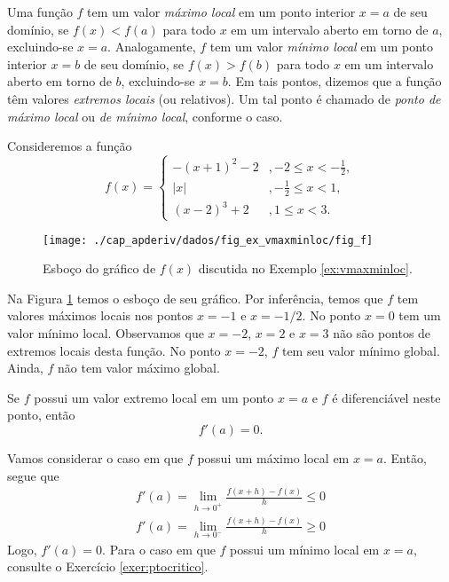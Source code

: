 Uma função $f$ tem um valor \emph{máximo local} em um ponto interior $x=a$ de seu domínio, se $f(x) < f(a)$ para todo $x$ em um intervalo aberto em torno de $a$, excluindo-se $x=a$. Analogamente, $f$ tem um valor \emph{mínimo local} em um ponto interior $x=b$ de seu domínio, se $f(x) > f(b)$  para todo $x$ em um intervalo aberto em torno de $b$, excluindo-se $x=b$. Em tais pontos, dizemos que a função têm valores \emph{extremos locais} (ou relativos). Um tal ponto é chamado de \emph{ponto de máximo local} ou \emph{de mínimo local}, conforme o caso.

\begin{ex}\label{ex:vmaxminloc}
  Consideremos a função
  \begin{equation}
    f(x) = \left\{
      \begin{array}{ll}
        -(x+1)^2-2 &, -2\leq x < -\frac{1}{2},\\
        |x| &, -\frac{1}{2} \leq x < 1,\\
        (x-2)^3+2 &, 1\leq x < 3.
      \end{array}
\right.
\end{equation}

  \begin{figure}[H]
    \centering
    \texttt{[image: ./cap\_apderiv/dados/fig\_ex\_vmaxminloc/fig\_f]}
    \caption{Esboço do gráfico de $f(x)$ discutida no Exemplo \ref{ex:vmaxminloc}.}
    \label{fig:ex_vmaxminloc}
  \end{figure}
  
Na Figura \ref{fig:ex_vmaxminloc} temos o esboço de seu gráfico. Por inferência, temos que $f$ tem valores máximos locais nos pontos $x=-1$ e $x=-1/2$. No ponto $x=0$ tem um valor mínimo local. Observamos que $x=-2$, $x=2$ e $x=3$ não são pontos de extremos locais desta função. No ponto $x=-2$, $f$ tem seu valor mínimo global. Ainda, $f$ não tem valor máximo global.
\end{ex}

\begin{teo}\label{teo:ptocritico}
  Se $f$ possui um valor extremo local em um ponto $x=a$ e $f$ é diferenciável neste ponto, então
  \begin{equation}
    f'(a) = 0.
  \end{equation}
\end{teo}
\begin{dem}
  Vamos considerar o caso em que $f$ possui um máximo local em $x=a$. Então, segue que
  \begin{gather}
    f'(a) = \lim_{h\to 0^+} \frac{f(x+h)-f(x)}{h} \leq 0\\
    f'(a) = \lim_{h\to 0^-} \frac{f(x+h)-f(x)}{h} \geq 0
  \end{gather}
  Logo, $f'(a) = 0$. Para o caso em que $f$ possui um mínimo local em $x=a$, consulte o Exercício \ref{exer:ptocritico}.
\end{dem}

